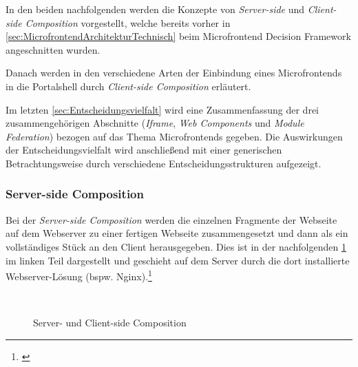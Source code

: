 In den beiden nachfolgenden  werden die Konzepte von \textit{Server-side} und \textit{Client-side Composition} vorgestellt, welche bereits vorher in \cref{sec:MicrofrontendArchitekturTechnisch} beim Microfrontend Decision Framework angeschnitten wurden.

Danach werden in den  verschiedene Arten der Einbindung eines Microfrontends in die Portalshell durch \textit{Client-side Composition} erläutert.

Im letzten \cref{sec:Entscheidungsvielfalt} wird eine Zusammenfassung der drei zusammengehörigen Abschnitte (\textit{Iframe}, \textit{Web Components} und \textit{Module Federation}) bezogen auf das Thema Microfrontends gegeben. Die Auswirkungen der Entscheidungsvielfalt wird anschließend mit einer generischen Betrachtungsweise durch verschiedene Entscheidungsstrukturen aufgezeigt.

\subsubsection{Server-side Composition}\label{sec:ServerSideComposition}

Bei der \textit{Server-side Composition} werden die einzelnen Fragmente der Webseite auf dem Webserver zu einer fertigen Webseite zusammengesetzt und dann als ein vollständiges Stück an den Client herausgegeben. Dies ist in der nachfolgenden \cref{fig:ServerClientSideComposition} im linken Teil dargestellt und geschieht auf dem Server durch die dort installierte Webserver-Lösung (bspw. Nginx).\footnote{\cite[vgl.][60]{Geers2020}}

\begin{figure}[hbt!]
	\centering
	\begin{minipage}[t]{1\textwidth}	
		\caption{Server- und Client-side Composition}
		\\ %
		\label{fig:ServerClientSideComposition}
	\end{minipage}
\end{figure}

